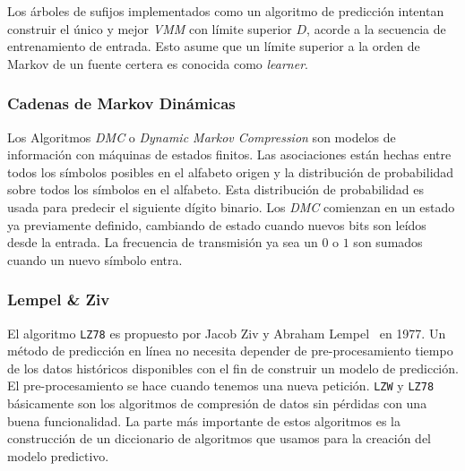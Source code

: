  Los árboles de sufijos implementados como un algoritmo de predicción intentan construir el único y mejor \emph{VMM} con límite superior $D$, acorde a la secuencia de entrenamiento de entrada. Esto asume que un límite superior a la orden de Markov de un fuente certera es conocida como \emph{learner}.
 
 
 
 \subsubsection{Cadenas de Markov Dinámicas}
 
 
 Los Algoritmos \emph{DMC} o \emph{Dynamic Markov Compression} son modelos de información con máquinas de estados finitos. Las asociaciones están hechas entre todos los símbolos posibles en el alfabeto origen y la distribución de probabilidad sobre todos los símbolos en el alfabeto. 
 Esta distribución de probabilidad es usada para predecir el siguiente dígito binario. 
 Los \emph{DMC} comienzan en un estado ya previamente definido, cambiando de estado cuando nuevos bits son leídos desde la entrada. La frecuencia de transmisión ya sea un $0$ o $1$ son sumados cuando un nuevo símbolo entra. %
 
 
\subsubsection{Lempel \& Ziv }


El algoritmo \texttt{LZ78} es propuesto por Jacob Ziv y Abraham Lempel~\cite{ZivLempel1977} en 1977. Un método de predicción en línea no necesita depender de pre-procesamiento tiempo de los datos históricos disponibles con el fin de construir un modelo de predicción. El pre-procesamiento se hace cuando tenemos una nueva petición. \texttt{LZW} y \texttt{LZ78} básicamente son los algoritmos de compresión de datos sin pérdidas con una buena funcionalidad. La parte más importante de estos algoritmos es la construcción de un diccionario de algoritmos que usamos para la creación del modelo predictivo. 







